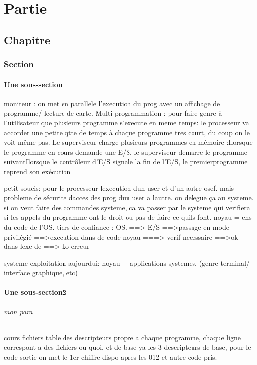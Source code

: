\documentclass{report}
\begin{document}
\part{Partie}
\chapter{Chapitre}
\section{Section}
\subsection{Une sous-section}
moniteur : on met en parallele l'execution du prog avec un affichage de programme/ lecture 
de carte.
Multi-programmation : pour faire genre à l'utilisateur que  plusieurs programme s'execute en meme temps: le processeur va accorder une petite qtte de temps à chaque programme tres court, du coup on le voit même pas.
Le superviseur charge plusieurs programmes en mémoire :Ilorsque le programme en cours demande une E/S, le superviseur demarre le programme suivantIlorsque le contrôleur d’E/S signale la fin de l’E/S, le premierprogramme reprend son exécution

petit soucis:
pour le processeur lexecution dun user et d'un autre osef.
mais probleme de sécurite dacces des prog dun user a lautre.
on delegue ça au systeme.
si on veut faire des commandes systeme, ca va passer par le systeme qui verifiera si les appels du programme ont le droit ou pas de faire ce quils font.
noyau = ens du code de l'OS.
tiers de confiance : OS.
==> E/S ==>passage en mode privilégié 
        ==>execution dans de code noyau
        ===> verif necessaire ==>ok dans lexe de 
                                ==> ko erreur

systeme exploitation aujourdui: noyau + applications systemes. (genre terminal/ interface graphique, etc)
        
        

\subsection{Une sous-section2}

\paragraph{mon para}
cours fichiers
table des descripteurs propre a chaque programme, chaque ligne correspont a des fichiers ou quoi, et de base ya les 3 descripteurs de base, pour le code sortie on met le 1er chiffre dispo apres les 012 et autre code pris.
\end{document}
